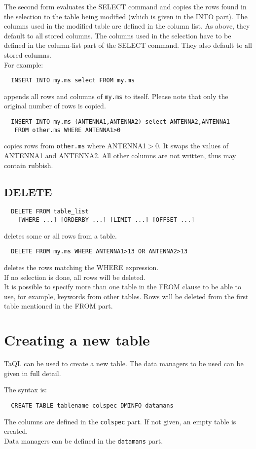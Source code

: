 The second form evaluates the SELECT command and copies the rows
found in the selection to the table being modified (which is given
in the INTO part).
The columns used in the modified table are defined in the column list.
As above, they default to all stored columns. The columns used in the
selection have to be defined in the column-list part of the SELECT command.
They also default to all stored columns.
\\For example:
\begin{verbatim}
  INSERT INTO my.ms select FROM my.ms
\end{verbatim}
appends all rows and columns of \texttt{my.ms} to itself.
Please note that only the original number of rows is copied.
\begin{verbatim}
  INSERT INTO my.ms (ANTENNA1,ANTENNA2) select ANTENNA2,ANTENNA1
   FROM other.ms WHERE ANTENNA1>0
\end{verbatim}
copies rows from \texttt{other.ms} where ANTENNA1$>$0. It swaps the
values of ANTENNA1 and ANTENNA2. All other columns are not written,
thus may contain rubbish.

\subsection{DELETE}
\begin{verbatim}
  DELETE FROM table_list
    [WHERE ...] [ORDERBY ...] [LIMIT ...] [OFFSET ...]
\end{verbatim}
deletes some or all rows from a table.
\begin{verbatim}
  DELETE FROM my.ms WHERE ANTENNA1>13 OR ANTENNA2>13
\end{verbatim}
deletes the rows matching the WHERE expression.
\\If no selection is done, all rows will be deleted.
\\It is possible to specify more than one table in the FROM clause to
be able to use, for example, keywords from other tables.
Rows will be deleted from the first table mentioned in the FROM part.

\section{\label{TAQL:CREATETABLE}Creating a new table}
TaQL can be used to create a new table. The data managers to be used
can be given in full detail.

The syntax is:
\begin{verbatim}
  CREATE TABLE tablename colspec DMINFO datamans
\end{verbatim}
The columns are defined in the \texttt{colspec} part. If not given, an
empty table is created.
\\Data managers can be defined in the \texttt{datamans} part.

